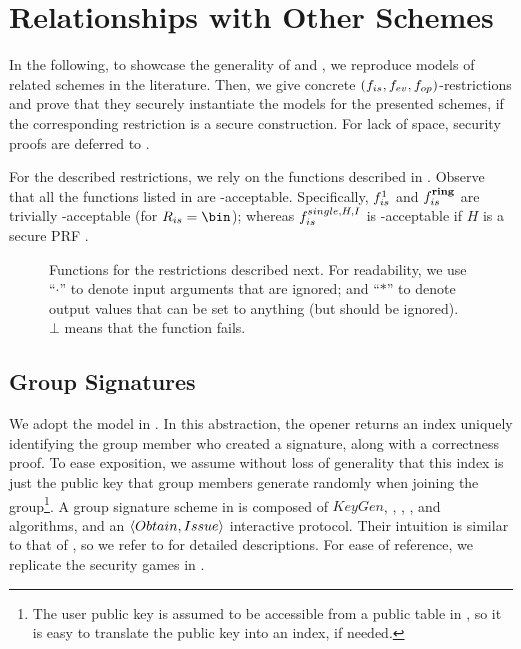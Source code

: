 \section{Relationships with Other Schemes}
\label{sec:relationships}


In the following, to showcase the generality of \UAS and \CUASGen, we reproduce
models of related schemes in the literature.
Then, we give concrete $(f_{is},f_{ev},f_{op})$-\CUASGen restrictions and prove
that they securely instantiate the models for the presented schemes, if the
corresponding \CUASGen restriction is a secure \UAS construction. For lack of
space, security proofs are deferred to .

For the described \CUASGen restrictions, we rely on the functions described in
. Observe that all the \fissue functions listed in
 are \UAS-acceptable. Specifically, $f_{is}^1$
and $f_{is}^{\mathbf{ring}}$ are trivially \UAS-acceptable (for $\rngfissue = \bin$);
whereas $f_{is}^{single,H,I}$ is \UAS-acceptable if $H$ is a secure PRF
\cite{kl14}.

\begin{figure}[ht!]
  \centering
  \scalebox{0.85}{
    
  }
  \caption{Functions for the \CUASGen restrictions described next.
    For readability, we use ``$\cdot$'' to denote input arguments that are
    ignored; and ``$\ast$'' to denote output values that can be set to anything
    (but should be ignored). $\bot$ means that the function fails.}
  \label{fig:func-restrictions}
\end{figure}

\subsection{Group Signatures}
\label{ssec:related-models-gs}

We adopt the model in \cite{bsz05}. In this abstraction, the opener returns an
index uniquely identifying the group member who created a signature, along with
a correctness proof. To ease exposition, we assume without loss of generality
that this index is just the public key that group members generate randomly
when joining the group\footnote{The user public key is
  assumed to be
  accessible from a public table in \cite{bsz05}, so it is easy to translate the
  public key into an index, if needed.}. A group signature scheme in
\cite{bsz05} is composed of $KeyGen$, \UKeyGen, \Sign, \Verify, \Open and
\Judge algorithms, and an $\langle Obtain,Issue\rangle$ interactive
protocol. Their intuition is similar to that of \UAS, so we refer to
\cite{bsz05} for detailed descriptions. For ease of reference, we replicate the
security games in .

